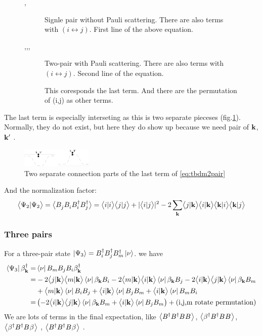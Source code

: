 \begin{figure}[htb]
\begin{description}
\item[,] Signle pair without Pauli scattering.  There are also terms with $(i\leftrightarrow{j})$. First line of the above equation. 
\item[,,,] Two-pair with Pauli scattering.  There are also terms with $(i\leftrightarrow{j})$. 
Second line of the equation. 
\item[] This coresponds the last term.  And there are the permutation of (i,j) as other terms.  
\end{description}
\end{figure}

The last term is especially interseting as this is two separate pieceses (fig.\ref{fig:shivaseparate}).  Normally, they do not exist, but here they do show up because we need pair of $\mathbf{k}$,$\mathbf{k}'$ .  
\begin{figure}[htb]\centering
 \includegraphics[width=0.3\textwidth]{image/shivaSeparate.eps}
\caption{Two separate connection parts of the last term of \eqref{eq:tbdm2pair}\label{fig:shivaseparate}}\centering
\end{figure}
And the normalization factor:
\begin{equation}
 {\ensuremath{\bigl<{{\Psi_2}|{\Psi_2}}\bigr>}}=\bigl<{B^{}_j{}B^{}_i{}B^{\dagger}_i{}B^{\dagger}_j}\bigr>=\bigl<{{i}|{i}}\bigr>\bigl<{{j}|{j}}\bigr>+\lvert{\ensuremath{\bigl<{{i}|{j}}\bigr>}}\rvert^2-2\sum_{\mathbf{k}}\bigl<{{j}|{\mathbf{k}}}\bigr>\bigl<{{i}|{\mathbf{k}}}\bigr>\bigl<{{\mathbf{k}}|{i}}\bigr>\bigl<{{\mathbf{k}}|{j}}\bigr>
\end{equation}

\subsubsection{Three pairs}
For a three-pair state $\left|\Psi_3\right>=B^{\dagger}_i{}B^{\dagger}_j{}B^{\dagger}_m\left|\nu\right>$. 
we have 
\begin{equation}
\begin{split}
 \left<\Psi_3\right|\beta^{\dagger}_{\mathbf{k}}=&\left<\nu\right|B_m{}B_j{}B_i\beta^{\dagger}_{\mathbf{k}}\\
=&-2\bigl<{{j}|{\mathbf{k}}}\bigr>\bigl<{{m}|{\mathbf{k}}}\bigr>\left<\nu\right|\beta_{\mathbf{k}}{}B_i-2\bigl<{{m}|{\mathbf{k}}}\bigr>\bigl<{{i}|{\mathbf{k}}}\bigr>\left<\nu\right|\beta_{\mathbf{k}}{}B_j
-2\bigl<{{i}|{\mathbf{k}}}\bigr>\bigl<{{j}|{\mathbf{k}}}\bigr>\left<\nu\right|\beta_{\mathbf{k}}{}B_m\\
&+\bigl<{{m}|{\mathbf{k}}}\bigr>\left<\nu\right|B_i{}B_j+\bigl<{{i}|{\mathbf{k}}}\bigr>\left<\nu\right|B_j{}B_m+\bigl<{{i}|{\mathbf{k}}}\bigr>\left<\nu\right|B_m{}B_i\\
=&\left(-2\bigl<{{i}|{\mathbf{k}}}\bigr>\bigl<{{j}|{\mathbf{k}}}\bigr>\left<\nu\right|\beta_{\mathbf{k}}{}B_m+\bigl<{{i}|{\mathbf{k}}}\bigr>\left<\nu\right|B_j{}B_m\right)+(\mbox{i,j,m rotate permutation})
\end{split}
\end{equation}
We are lots of terms in the final expectation, like $\bigl<{B^{\dagger}{}B^{\dagger}{}B^{}B^{}}\bigr>$, $\bigl<{\beta^{\dagger}{}B^{\dagger}{}B^{}B^{}}\bigr>$,$\bigl<{\beta^{\dagger}{}B^{\dagger}{}B^{}\beta^{}}\bigr>$ , $\bigl<{B^{\dagger}{}B^{\dagger}{}B^{}\beta^{}}\bigr>$ .  